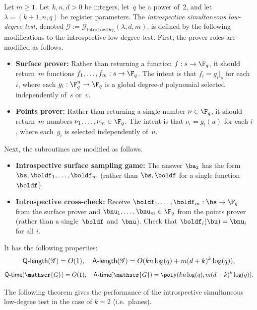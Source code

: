 \documentclass[11pt]{article}
\newcommand{\game}{\mathscr{G}}
\newcommand{\qtime}[1]{\mathsf{Q}\textnormal{-}\mathsf{time}(#1)}
\newcommand{\atime}[1]{\mathsf{A}\textnormal{-}\mathsf{time}(#1)}
\newcommand{\qlength}[1]{\mathsf{Q}\textnormal{-}\mathsf{length}(#1)}
\newcommand{\alength}[1]{\mathsf{A}\textnormal{-}\mathsf{length}(#1)}
\begin{document}
\begin{definition}
Let $m \geq 1$.
Let $k, n, d>0$ be integers, let~$q$ be a power of~$2$,
and let $\lambda = (k+1, n, q)$ be register parameters.
The \emph{introspective simultaneous low-degree test}, denoted $\game :=\game_{\mathrm{IntroLowDeg}}(\lambda, d, m)$,
is defined by the following modifications to the introspective low-degree test.
First, the prover roles are modified as follows.
\begin{itemize}
\item[$\circ$] \textbf{Surface prover:} Rather than returning a function $f:s\rightarrow \F_q$, it should return~$m$ functions $f_1, \ldots, f_m : s\rightarrow \F_q$.
			The intent is that $f_i = g_i |_{s}$ for each $i$, where each $g_i :\F_q^n \rightarrow \F_q$ is a global degree-$d$ polynomial
				selected independently of~$s$ or~$v$.
\item[$\circ$] \textbf{Points prover:} Rather than returning a single number $\nu \in \F_q$, it should return~$m$ numbers $\nu_1, \ldots, \nu_m \in \F_q$.
			The intent is that $\nu_i = g_i(u)$ for each $i$, where each~$g_i$ is selected independently of~$u$.
\end{itemize}
Next, the subroutines are modified as follows.
\begin{itemize}
\item[$\circ$] \textbf{Introspective surface sampling game:} The answer $\ba_2$ has the
  form $\bs, \boldf_1, \ldots, \boldf_m$ (rather than $\bs, \boldf$
  for a single function $\boldf$).
\item[$\circ$] \textbf{Introspective cross-check:} Receive $\boldf_1, \ldots, \boldf_m : \bs \rightarrow \F_q$ from the surface prover and $\bnu_1, \ldots, \bnu_m \in \F_q$ from the points prover
				(rather than a single~$\boldf$ and~$\bnu$). Check that $\boldf_i(\bu) = \bnu_i$ for all $i$.
\end{itemize}
It has the following properties:
\begin{equation*}
\qlength{\game} = O(1), \quad
\alength{\game} = O(k n \log(q) + m (d+k)^k \log(q)),
\end{equation*}
\begin{equation*}
\qtime{\game} = O(1), \quad
\atime{\game} = \poly(k n \log(q), m (d+k)^k \log(q)).
\end{equation*}
\end{definition}

The following theorem gives the performance of the introspective simultaneous low-degree test in the case of $k=2$ (i.e.\ planes).
\end{document}
